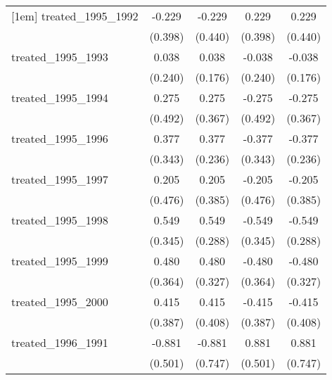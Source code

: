 {\begin{tabular}{l*{4}{c}}
[1em]
treated\_1995\_1992&      -0.229         &      -0.229         &       0.229         &       0.229         \\
            &     (0.398)         &     (0.440)         &     (0.398)         &     (0.440)         \\
[1em]
treated\_1995\_1993&       0.038         &       0.038         &      -0.038         &      -0.038         \\
            &     (0.240)         &     (0.176)         &     (0.240)         &     (0.176)         \\
[1em]
treated\_1995\_1994&       0.275         &       0.275         &      -0.275         &      -0.275         \\
            &     (0.492)         &     (0.367)         &     (0.492)         &     (0.367)         \\
[1em]
treated\_1995\_1996&       0.377         &       0.377         &      -0.377         &      -0.377         \\
            &     (0.343)         &     (0.236)         &     (0.343)         &     (0.236)         \\
[1em]
treated\_1995\_1997&       0.205         &       0.205         &      -0.205         &      -0.205         \\
            &     (0.476)         &     (0.385)         &     (0.476)         &     (0.385)         \\
[1em]
treated\_1995\_1998&       0.549         &       0.549         &      -0.549         &      -0.549         \\
            &     (0.345)         &     (0.288)         &     (0.345)         &     (0.288)         \\
[1em]
treated\_1995\_1999&       0.480         &       0.480         &      -0.480         &      -0.480         \\
            &     (0.364)         &     (0.327)         &     (0.364)         &     (0.327)         \\
[1em]
treated\_1995\_2000&       0.415         &       0.415         &      -0.415         &      -0.415         \\
            &     (0.387)         &     (0.408)         &     (0.387)         &     (0.408)         \\
[1em]
treated\_1996\_1991&      -0.881         &      -0.881         &       0.881         &       0.881         \\
            &     (0.501)         &     (0.747)         &     (0.501)         &     (0.747)         \\

\end{tabular}}
